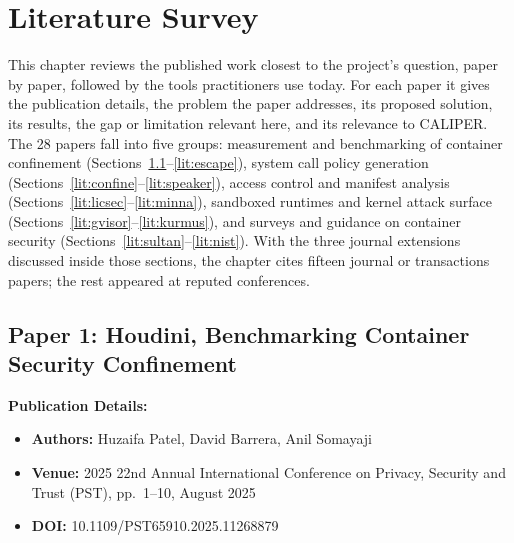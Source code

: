 \chapter{Literature Survey}
\label{ch:literature}

This chapter reviews the published work closest to the project's question, paper by paper, followed by the tools practitioners use today. For each paper it gives the publication details, the problem the paper addresses, its proposed solution, its results, the gap or limitation relevant here, and its relevance to CALIPER. The 28 papers fall into five groups: measurement and benchmarking of container confinement (Sections~\ref{lit:houdini}--\ref{lit:escape}), system call policy generation (Sections~\ref{lit:confine}--\ref{lit:speaker}), access control and manifest analysis (Sections~\ref{lit:licsec}--\ref{lit:minna}), sandboxed runtimes and kernel attack surface (Sections~\ref{lit:gvisor}--\ref{lit:kurmus}), and surveys and guidance on container security (Sections~\ref{lit:sultan}--\ref{lit:nist}). With the three journal extensions discussed inside those sections, the chapter cites fifteen journal or transactions papers; the rest appeared at reputed conferences.

\newcommand{\litpaper}[4]{%
\noindent\textbf{Publication Details:}
\begin{itemize}[leftmargin=*,itemsep=0pt]
\item \textbf{Authors:} #1
\item \textbf{Venue:} #2
\item \textbf{#3:} #4
\end{itemize}}
\newcommand{\litpart}[1]{\par\textbf{#1:}\ }

\section{Paper 1: Houdini, Benchmarking Container Security Confinement}
\label{lit:houdini}
\litpaper{Huzaifa Patel, David Barrera, Anil Somayaji}{2025 22nd Annual International Conference on Privacy, Security and Trust (PST), pp.~1--10, August 2025}{DOI}{10.1109/PST65910.2025.11268879}

